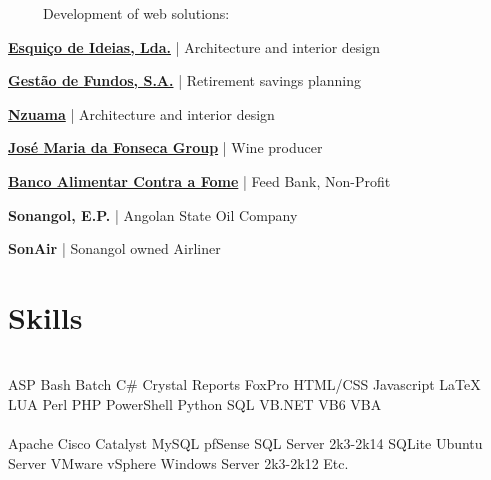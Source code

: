\documentclass[letterpaper]{deedy-resume} %
\begin{document}
\begin{minipage}[t]{0.66\textwidth}
\-\	\ \ \ \ Development of web solutions:
\begin{tightitemize}
	\item \href{http://esquicodeideias.com}{\textbf{Esquiço de Ideias, Lda.}} | Architecture and interior design
	\item \href{http://gestaodefundos.co.ao}{\textbf{Gestão de Fundos, S.A.}} | Retirement savings planning
	\item \href{http://nzuama.com}{\textbf{Nzuama}} | Architecture and interior design
	\item \href{http://www.jmf.pt/}{\textbf{José Maria da Fonseca Group}} | Wine producer
	\item \href{http://www.bancoalimentar.pt/}{\textbf{Banco Alimentar Contra a Fome}} | Feed Bank, Non-Profit
	\item \textbf{Sonangol, E.P.} | Angolan State Oil Company
	\item \textbf{SonAir} | Sonangol owned Airliner
\end{tightitemize}

\sectionspace

\section{Skills}

\\
ASP \textbullet{} Bash \textbullet{} Batch \textbullet{} C\# \textbullet{} Crystal Reports \textbullet{} FoxPro \textbullet{} HTML/CSS \textbullet{} Javascript \textbullet{} \LaTeX{} \textbullet{} LUA \textbullet{} Perl \textbullet{} PHP \textbullet{} PowerShell \textbullet{} Python \textbullet{} SQL \textbullet{} VB.NET \textbullet{} VB6 \textbullet{} VBA\\
\\
Apache \textbullet{} Cisco Catalyst \textbullet{} MySQL \textbullet{} pfSense \textbullet{} SQL Server 2k3-2k14 \textbullet{} SQLite \textbullet{} Ubuntu Server \textbullet{} VMware vSphere \textbullet{} Windows Server 2k3-2k12 \textbullet{} Etc.\\

\end{minipage} %

\end{document}
